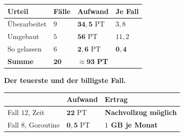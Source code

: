 \begin{merksatz}
\begin{center}
{\small
\renewcommand{\arraystretch}{1.42}
\begin{tabular}{@{}P{2.6cm}P{2.0cm}P{2.0cm}P{2.0cm}@{}}
\toprule
\textbf{Urteil} & \textbf{Fälle} & \textbf{Aufwand} & \textbf{Je Fall}\\
\midrule
Überarbeitet & $9$ & $\mathbf{34{,}5}$ PT & $3{,}8$\\
Umgebaut & $5$ & \textcolor{akzent}{$\mathbf{56}$ PT} & \textcolor{akzent}{$11{,}2$}\\
So gelassen & $6$ & \textcolor{gruen}{$\mathbf{2{,}6}$ PT} & \textcolor{gruen}{$\mathbf{0{,}4}$}\\
\midrule
\textbf{Summe} & $\mathbf{20}$ & $\approx\mathbf{93}$ \textbf{PT} & \\
\bottomrule
\end{tabular}}
\end{center}

\begin{center}
\begin{minipage}{0.88\textwidth}
\end{minipage}
\end{center}

\textbf{Der teuerste und der billigste Fall.}

\begin{center}
\renewcommand{\arraystretch}{1.45}
\begin{tabular}{@{}P{2.6cm}P{2.2cm}P{2.8cm}@{}}
\toprule
& \textbf{Aufwand} & \textbf{Ertrag}\\
\midrule
Fall $12$, Zeit & \textcolor{akzent}{$\mathbf{22}$ PT} & \textbf{Nachvollzug möglich}\\
Fall $8$, Goroutine & \textcolor{gruen}{$\mathbf{0{,}5}$ PT} & \textcolor{gruen}{\textbf{$1$ GB je Monat}}\\
\bottomrule
\end{tabular}
\end{center}

\begin{center}
\end{center}
\end{merksatz}


